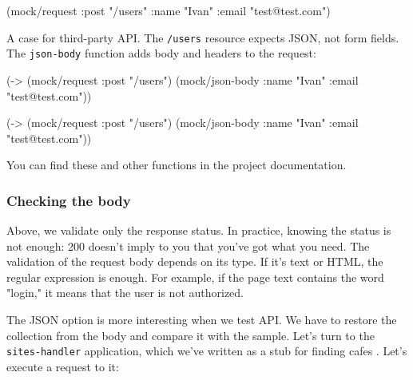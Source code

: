 \else

\begin{english}
  \begin{clojure}
(mock/request :post "/users"
              {:name "Ivan" :email "test@test.com"})
  \end{clojure}
\end{english}

\fi


\noindent
A case for third-party API. The \verb|/users| resource expects JSON, not form fields. The \verb|json-body| function adds body and headers to the request:

\ifnarrow

\begin{english}
  \begin{clojure}
(-> (mock/request :post "/users")
    (mock/json-body
      {:name "Ivan"
       :email "test@test.com"}))
  \end{clojure}
\end{english}

\else

\begin{english}
  \begin{clojure}
(-> (mock/request :post "/users")
    (mock/json-body {:name "Ivan" :email "test@test.com"}))
  \end{clojure}
\end{english}

\fi

\noindent
You can find these and other functions in the project documentation.

\subsubsection*{Checking the body}

Above, we validate only the response status. In practice, knowing the status is not enough: 200 doesn't imply to you that you've got what you need. The validation of the request body depends on its type. If it's text or HTML, the regular expression is enough. For example, if the page text contains the word "login," it means that the user is not authorized.


The JSON option is more interesting when we test API. We have to restore the collection from the body and compare it with the sample. Let's turn to the \verb|sites-handler| application, which we've written as a stub for finding cafes . Let's execute a request to it:

